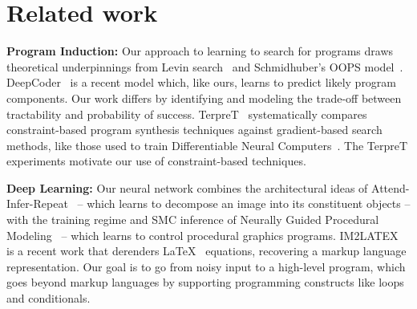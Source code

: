 \documentclass{article}
\theoremstyle{definition}
\begin{document}

\section{Related work}

\textbf{Program Induction:}
Our approach to learning to search for programs draws theoretical
underpinnings from Levin
search~\citep{levin1973universal,solomonoff1984optimum} and
Schmidhuber's OOPS model~\citep{schmidhuber2004optimal}.
DeepCoder~\citep{BalGauBroetal16} is a recent model which, like ours, learns to predict likely program components.
Our work differs by identifying and modeling
the trade-off between tractability and probability of success.
TerpreT~\citep{gaunt2016terpret} 
systematically compares constraint-based program synthesis techniques
against gradient-based search methods, like those used to train
Differentiable Neural Computers~\citep{graves2016hybrid}.  The TerpreT
experiments motivate our use of constraint-based techniques.



\textbf{Deep Learning:} Our neural network combines the architectural ideas of Attend-Infer-Repeat~\citep{eslami1603attend} -- which learns to decompose an image into its constituent objects -- with the training regime and SMC inference  of Neurally Guided Procedural Modeling~\cite{ritchie2016neurally} -- which learns to control procedural graphics programs.
IM2LATEX~\citep{im2latex} is a recent work that 
 derenders  \LaTeX~ equations,
recovering a markup language representation.
Our goal is to go from
noisy input to a high-level program,
which goes beyond markup languages by supporting
programming constructs like loops and conditionals.
\end{document}
